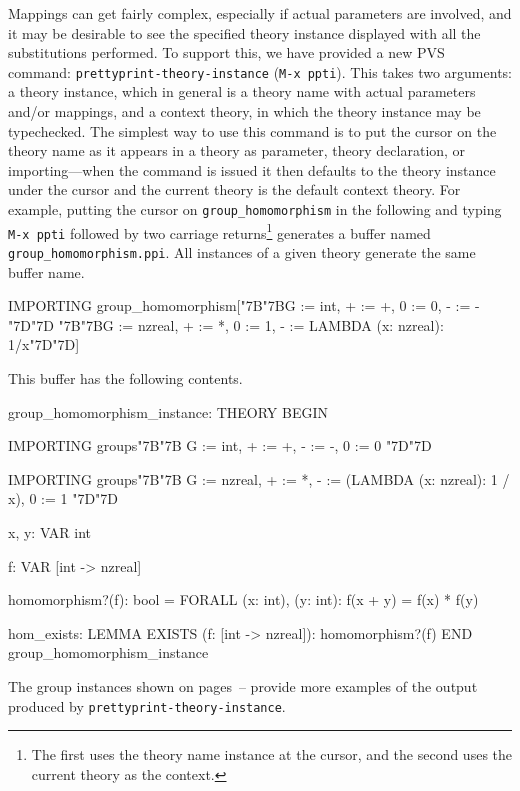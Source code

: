\documentclass[11pt,twoside,openright,titlepage]{cslreport}
\def\mapb{\char"7B\char"7B}
\def\mape{\char"7D\char"7D}
\begin{document}
Mappings can get fairly complex, especially if actual parameters are
involved, and it may be desirable to see the specified theory instance
displayed with all the substitutions performed.  To support this, we have
provided a new PVS command: \texttt{prettyprint-theory-instance}
(\texttt{M-x ppti}).  This takes two arguments: a theory instance, which
in general is a theory name with actual parameters and/or mappings, and a
context theory, in which the theory instance may be typechecked.  The
simplest way to use this command is to put the cursor on the theory name
as it appears in a theory as parameter, theory declaration, or
importing---when the command is issued it then defaults to the theory
instance under the cursor and the current theory is the default
context theory.  For example, putting the cursor on
\texttt{group\_homomorphism} in the following and typing \texttt{M-x ppti}
followed by two carriage returns\footnote{The first uses the theory name
instance at the cursor, and the second uses the current theory as the
context.} generates a buffer named \texttt{group\_homomorphism.ppi}.
All instances of a given theory generate the same buffer name.
\begin{session}
IMPORTING group_homomorphism[\mapb{}G := int, + := +, 0 := 0, - := -\mape{}
                             \mapb{}G := nzreal, + := *, 0 := 1,
                               - := LAMBDA (x: nzreal): 1/x\mape{}]
\end{session}
\noindent This buffer has the following contents.
\begin{session}
group_homomorphism_instance: THEORY
 BEGIN

  IMPORTING groups\mapb{} G := int, + := +, - := -, 0 := 0 \mape{}

  IMPORTING groups\mapb{} G := nzreal, + := *,
                     - := (LAMBDA (x: nzreal): 1 / x), 0 := 1 \mape{}

  x, y: VAR int

  f: VAR [int -> nzreal]

  homomorphism?(f): bool =
    FORALL (x: int), (y: int): f(x + y) = f(x) * f(y)

  hom_exists: LEMMA EXISTS (f: [int -> nzreal]): homomorphism?(f)
 END group_homomorphism_instance
\end{session}
The group instances shown on
pages~\pageref{group-instances-start}--\pageref{group-instances-end}
provide more examples of the output produced by
\texttt{prettyprint-theory-instance}.
\end{document}
